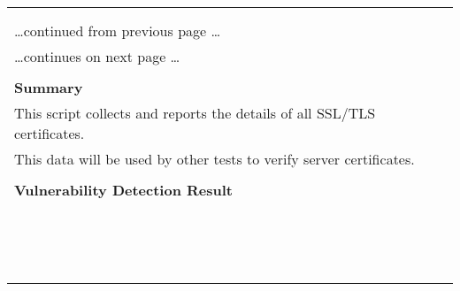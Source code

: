 \documentclass{article}
\begin{document}
\begin{longtable}{|p{}|}
\hline
\rowcolor{gvm_log}{\color{white}{Log (CVSS: 0.0) }}\\
\rowcolor{gvm_log}{\color{white}{NVT: SSL/TLS: Collect and Report Certificate Details}}\\
\hline
\endfirsthead
\hfill\ldots continued from previous page \ldots \\
\hline
\endhead
\hline
\ldots continues on next page \ldots \\
\endfoot
\hline
\endlastfoot
\\
\textbf{Summary}\\
This script collects and reports the details of all SSL/TLS
  certificates.\\
  This data will be used by other tests to verify server certificates.\\

        \hline
        \\
\textbf{Vulnerability Detection Result}\\
\rowcolor{white}{\verb=The following certificate details of the remote service were collected.=}\\
\rowcolor{white}{\verb=Certificate details:=}\\
\rowcolor{white}{\verb=fingerprint (SHA-1)             | CFB7FD5D27141810D8F9CE8D1BD74B12E6E26780=}\\
\rowcolor{white}{\verb=fingerprint (SHA-256)           | 5ECA6F620C8BC526BEA6FA3E37282C1FD1E98BDC85CAB6=}\\
\rowcolor{white}{$\hookrightarrow$\verb=F55C8C4DEDDEEEA99C=}\\
\rowcolor{white}{\verb=issued by                       | CN=\verb-=-\verb=92.192.143.206=}\\
\rowcolor{white}{\verb=public key algorithm            | RSA=}\\
\rowcolor{white}{\verb=public key size (bits)          | 2048=}\\
\rowcolor{white}{\verb=serial                          | 58C6BD4C62AC35CA3C7D9EA7569675FA4263ECDF=}\\
\rowcolor{white}{\verb=signature algorithm             | sha256WithRSAEncryption=}\\
\rowcolor{white}{\verb=subject                         | CN=\verb-=-\verb=92.192.143.206=}\\
\rowcolor{white}{\verb=subject alternative names (SAN) | Breuelstrasse11, fritz.nas, www.fritz.nas, fri=}\\
\rowcolor{white}{$\hookrightarrow$\verb=tz.box, www.fritz.box, myfritz.box, www.myfritz.box=}\\
\rowcolor{white}{\verb=valid from                      | 2022-04-22 05:53:04 UTC=}\\
\rowcolor{white}{\verb=valid until                     | 2038-01-15 05:53:04 UTC=}\\


\end{longtable}
\end{document}
